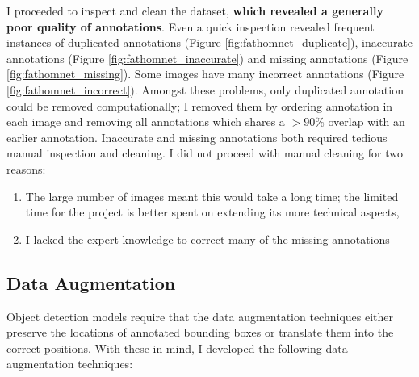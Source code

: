 \documentclass[12pt,a4paper,twoside,openany]{report}
\begin{document}
I proceeded to inspect and clean the dataset, \textbf{which revealed a generally poor quality of annotations}. Even a quick inspection revealed frequent instances of duplicated annotations (Figure \ref{fig:fathomnet_duplicate}), inaccurate annotations (Figure \ref{fig:fathomnet_inaccurate}) and missing annotations (Figure \ref{fig:fathomnet_missing}). Some images have many incorrect annotations (Figure \ref{fig:fathomnet_incorrect}). Amongst these problems, only duplicated annotation could be removed computationally; I removed them by ordering annotation in each image and removing all annotations which shares a $>90\%$ overlap with an earlier annotation. Inaccurate and missing annotations both required tedious manual inspection and cleaning. I did not proceed with manual cleaning for two reasons:
\begin{enumerate}
    \item The large number of images meant this would take a long time;  the limited time for the project is better spent on extending its more technical aspects,
    \item I lacked the expert knowledge to correct many of the missing annotations
\end{enumerate}

\subsection{Data Augmentation} \label{section: data_aug}
Object detection models require that the data augmentation techniques either preserve the locations of annotated bounding boxes or translate them into the correct positions. With these in mind, I developed the following data augmentation techniques: 
\end{document}
